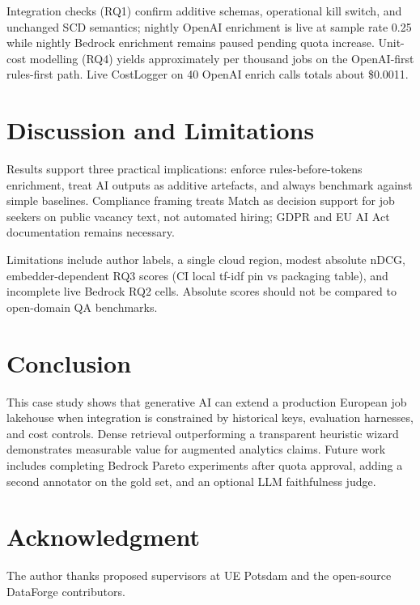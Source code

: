 \documentclass[conference]{IEEEtran}
\begin{document}
Integration checks (RQ1) confirm additive schemas, operational kill switch, and unchanged SCD semantics; nightly OpenAI enrichment is live at sample rate 0.25 while nightly Bedrock enrichment remains paused pending quota increase.
Unit-cost modelling (RQ4) yields approximately  per thousand jobs on the OpenAI-first rules-first path. Live CostLogger on 40 OpenAI enrich calls totals about \$0.0011.

\section{Discussion and Limitations}
\label{sec:discussion}

Results support three practical implications: enforce rules-before-tokens enrichment, treat AI outputs as additive artefacts, and always benchmark against simple baselines.
Compliance framing treats Match as decision support for job seekers on public vacancy text, not automated hiring; GDPR and EU AI Act documentation remains necessary.

Limitations include author labels, a single cloud region, modest absolute nDCG, embedder-dependent RQ3 scores (CI local tf-idf pin vs packaging table), and incomplete live Bedrock RQ2 cells.
Absolute scores should not be compared to open-domain QA benchmarks.

\section{Conclusion}
\label{sec:conclusion}

This case study shows that generative AI can extend a production European job lakehouse when integration is constrained by historical keys, evaluation harnesses, and cost controls.
Dense retrieval outperforming a transparent heuristic wizard demonstrates measurable value for augmented analytics claims.
Future work includes completing Bedrock Pareto experiments after quota approval, adding a second annotator on the gold set, and an optional LLM faithfulness judge.

\section*{Acknowledgment}

The author thanks proposed supervisors at UE Potsdam and the open-source DataForge contributors.



\end{document}
